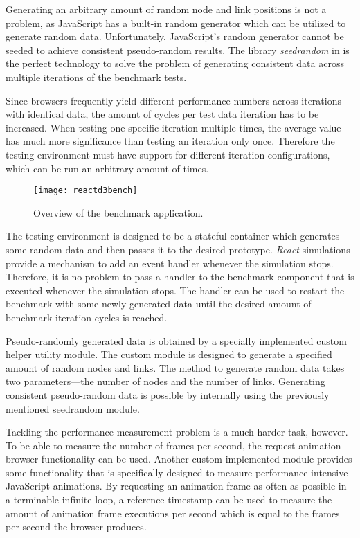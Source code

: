 Generating an arbitrary amount of random node and link positions is not a problem, as JavaScript has a built-in random generator which can be utilized to generate random data. Unfortunately, JavaScript's random generator cannot be seeded to achieve consistent pseudo-random results. The library \emph{seedrandom} in \cite{SeedRandom} is the perfect technology to solve the problem of generating consistent data across multiple iterations of the benchmark tests.

Since browsers frequently yield different performance numbers across iterations with identical data, the amount of cycles per test data iteration has to be increased. When testing one specific iteration multiple times, the average value has much more significance than testing an iteration only once. Therefore the testing environment must have support for different iteration configurations, which can be run an arbitrary amount of times.

\begin{figure}
  \centering
  \texttt{[image: reactd3bench]}
  \caption{Overview of the benchmark application.}
  \label{fig:reactD3bench1}
\end{figure}

The testing environment is designed to be a stateful container which generates some random data and then passes it to the desired prototype. \emph{React} simulations provide a mechanism to add an event handler whenever the simulation stops. Therefore, it is no problem to pass a handler to the benchmark component that is executed whenever the simulation stops. The handler can be used to restart the benchmark with some newly generated data until the desired amount of benchmark iteration cycles is reached.

Pseudo-randomly generated data is obtained by a specially implemented custom helper utility module. The custom module is designed to generate a specified amount of random nodes and links. The method to generate random data takes two parameters---the number of nodes and the number of links. Generating consistent pseudo-random data is possible by internally using the previously mentioned seedrandom module.

Tackling the performance measurement problem is a much harder task, however. To be able to measure the number of frames per second, the request animation browser functionality can be used. Another custom implemented module provides some functionality that is specifically designed to measure performance intensive JavaScript animations. By requesting an animation frame as often as possible in a terminable infinite loop, a reference timestamp can be used to measure the amount of animation frame executions per second which is equal to the frames per second the browser produces.

